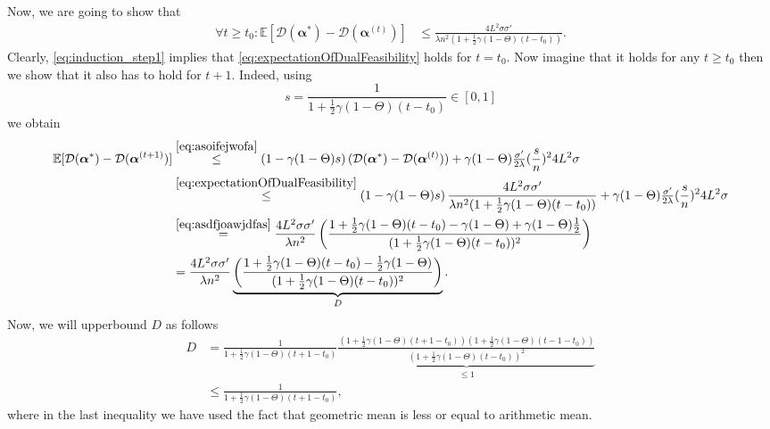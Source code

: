 \documentclass{article}
\newcommand{\Exp}{\mathbb{E}}                      %
\newcommand{\alphav}{ {\boldsymbol \alpha}}
\newcommand{\0}{ {\bf 0}}
\newcommand{\vc}[2]{#1^{(#2)}}                   %
\newcommand{\bD}{\mathcal{D}}
\theoremstyle{plain}
\theoremstyle{definition}
\begin{document}
Now, we are going to show that 
\begin{align}
\label{eq:expectationOfDualFeasibility}
\forall t\geq t_0 :  \Exp[\bD(\alphav^* )-\bD(\vc{\alphav}{t})]
&\leq 
\frac{4L^2  \sigma   \sigma'}{\lambda n^2( 1+ \frac12  \gamma (1-\Theta)  (t-t_0))}.
\end{align}
Clearly, \eqref{eq:induction_step1} implies that \eqref{eq:expectationOfDualFeasibility} holds for $t=t_0$.
Now imagine that it holds for any $t\geq t_0$ then we show that it also has to hold for $t+1$. 
Indeed, using 
\begin{equation}
\label{eq:asdfjoawjdfas}
s=
\frac{1}
 {1+ \frac12 \gamma (1-\Theta) (t-t_0)} \in [0,1]
\end{equation} 
  we obtain
\begin{align*}
\Exp[
\bD(\alphav^* )-\bD(\vc{\alphav}{t+1})]
&\overset{\eqref{eq:asoifejwofa}
}{\leq}
\left( 
 1-\gamma
(1-\Theta)
   s
\right) 
   (\bD(\alphav^* )-\bD(\vc{\alphav}{t}))
+
\gamma
(1-\Theta) 
\tfrac{\sigma'}{2\lambda }
(\frac s{  n})^2
4L^2  \sigma
\\
&\overset{\eqref{eq:expectationOfDualFeasibility}
}{\leq}
\left( 
 1-\gamma
(1-\Theta)
   s
\right) 
   \frac{4L^2  \sigma   \sigma'}{\lambda n^2( 1+ \frac12  \gamma (1-\Theta)  (t-t_0))}
+
\gamma
(1-\Theta) 
\tfrac{\sigma'}{2\lambda }
(\frac s{  n})^2
4L^2  \sigma
\\
&
\overset{\eqref{eq:asdfjoawjdfas}}{=}
\frac{4L^2  \sigma   \sigma'}
     {\lambda n^2}
\left( 
\frac{
1+ \frac12 \gamma (1-\Theta) (t-t_0)
-\gamma
(1-\Theta)
+
\gamma
(1-\Theta) 
\tfrac{1}{2}
}
 {(1+ \frac12 \gamma (1-\Theta) (t-t_0))^2}
\right)
\\
&=
\frac{4L^2  \sigma   \sigma'}
     {\lambda n^2}
\underbrace{\left( 
\frac{
1+ \frac12 \gamma (1-\Theta) (t-t_0)
-\frac12 \gamma
(1-\Theta)
}
 {(1+ \frac12 \gamma (1-\Theta) (t-t_0))^2}
\right)}_{D}.
\end{align*}
Now, we will upperbound $D$ as follows
\begin{align*}
D&=
\frac1
{1+ \frac12 \gamma (1-\Theta) (t+1-t_0)}
\underbrace{
\frac{
(1+ \frac12 \gamma (1-\Theta) (t+1-t_0))
(1+ \frac12 \gamma (1-\Theta) (t-1-t_0))
}
 {(1+ \frac12 \gamma (1-\Theta) (t-t_0))^2}}_{\leq 1}
 \\
&\leq  
\frac1
{1+ \frac12 \gamma (1-\Theta) (t+1-t_0)},
\end{align*}
where in the last inequality we have used the fact that geometric mean
 is less or equal to arithmetic mean. 
 
\end{document}
